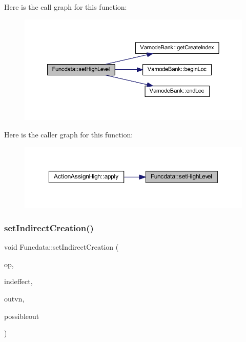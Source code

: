 Here is the call graph for this function\+:
\nopagebreak
\begin{figure}[H]
\begin{center}
\leavevmode
\includegraphics[width=350pt]{class_funcdata_afadeeb585ee8728c427fd6914b8bb7b1_cgraph}
\end{center}
\end{figure}
Here is the caller graph for this function\+:
\nopagebreak
\begin{figure}[H]
\begin{center}
\leavevmode
\includegraphics[width=350pt]{class_funcdata_afadeeb585ee8728c427fd6914b8bb7b1_icgraph}
\end{center}
\end{figure}
\mbox{\label{class_funcdata_a1ffffe235b79fb8b9bc955d93ad0b18a}} 
\subsubsection{\texorpdfstring{setIndirectCreation()}{setIndirectCreation()}}
{\footnotesize\ttfamily void Funcdata\+::set\+Indirect\+Creation (\begin{DoxyParamCaption}\item[{\mbox{\hyperlink{class_pcode_op}{Pcode\+Op}} $\ast$}]{op,  }\item[{\mbox{\hyperlink{class_pcode_op}{Pcode\+Op}} $\ast$}]{indeffect,  }\item[{\mbox{\hyperlink{class_varnode}{Varnode}} $\ast$}]{outvn,  }\item[{bool}]{possibleout }\end{DoxyParamCaption})}



